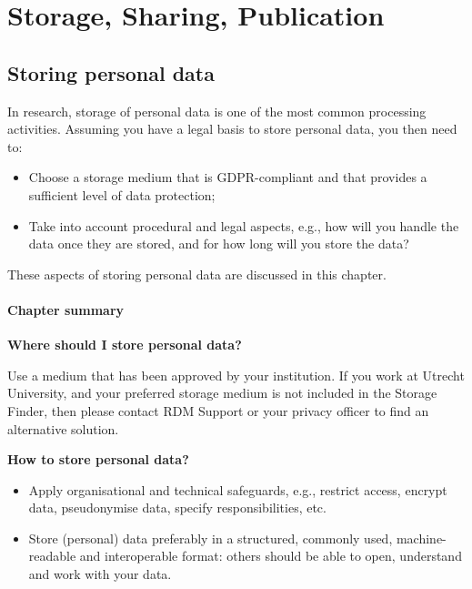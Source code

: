 \documentclass[
]{book}
\providecommand{\tightlist}{%
  \setlength{\itemsep}{0pt}\setlength{\parskip}{0pt}}
\begin{document}
\hypertarget{part-storage-sharing-publication}{%
\part*{Storage, Sharing, Publication}\label{part-storage-sharing-publication}}

\hypertarget{data-storage}{%
\chapter{Storing personal data}\label{data-storage}}

In research, storage of personal data is one of the most common processing
activities. Assuming you have a legal basis to store personal data, you
then need to:

\begin{itemize}
\tightlist
\item
  Choose a storage medium that is GDPR-compliant and that provides a sufficient
  level of data protection;
\item
  Take into account procedural and legal aspects, e.g., how will you handle the
  data once they are stored, and for how long will you store the data?
\end{itemize}

These aspects of storing personal data are discussed in this chapter.

\hypertarget{chapter-summary-1}{%
\subsection{Chapter summary}\label{chapter-summary-1}}

\textbf{Where should I store personal data?}

Use a medium that has been approved by your institution. If you work at Utrecht
University, and your preferred storage medium is not included in the
Storage Finder,
then please contact
RDM Support
or your privacy officer
to find an alternative solution.

\textbf{How to store personal data?}

\begin{itemize}
\tightlist
\item
  Apply organisational and technical safeguards,
  e.g., restrict access, encrypt data, pseudonymise data, specify responsibilities, etc.
\item
  Store (personal) data preferably in a structured, commonly used, machine-readable
  and interoperable format: others should be able to open, understand and work
  with your data.
\end{itemize}
\end{document}
